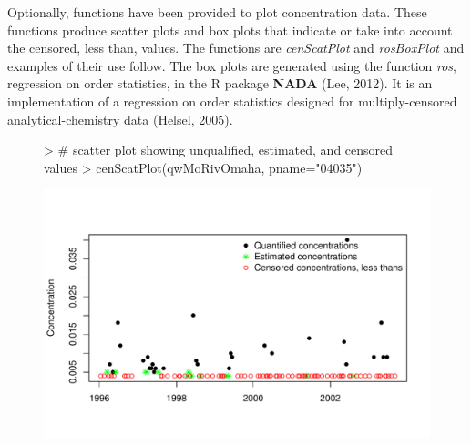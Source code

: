 \documentclass[11pt]{article}
\begin{document}
Optionally, functions have been provided to plot concentration data.  These functions produce scatter plots and box plots that indicate or take into account the censored, less than, values.  The functions are \textit{cenScatPlot} and \textit{rosBoxPlot} and examples of their use follow.  The box plots are generated using the function \textit{ros}, regression on order statistics, in the R package \textbf{NADA} (Lee, 2012).  It is an implementation of a regression on order statistics designed for multiply-censored analytical-chemistry data  (Helsel, 2005). 
\vspace{5 mm}

\begin{figure}[H]
\centering
\begin{Schunk}
\begin{Sinput}
> # scatter plot showing unqualified, estimated, and censored  values
> cenScatPlot(qwMoRivOmaha, pname="04035")
\end{Sinput}
\end{Schunk}
\includegraphics{vignette-002}
\end{figure}
\end{document}
